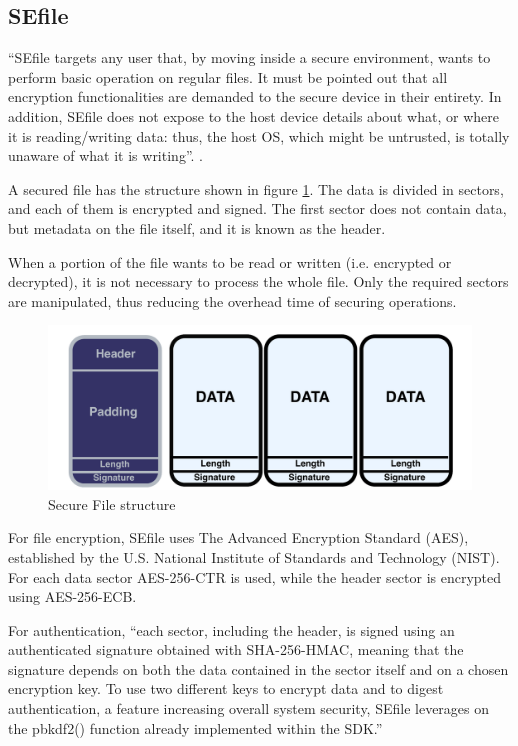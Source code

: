 \subsection{SEfile}

``SEfile targets any user that, by moving inside a secure environment, wants to perform basic operation on regular files. It must be pointed out that all encryption functionalities are demanded to the secure device in their entirety. In addition, SEfile does not expose to the host device details about what, or where it is reading/writing data: thus, the host OS, which might be untrusted, is totally unaware of what it is writing''. \cite{L2UserMan}.


A secured file has the structure shown in figure \ref{fig:secfile}. The data is divided in sectors, and each of them is encrypted and signed. The first sector does not contain data, but metadata on the file itself, and it is known as the header.

When a portion of the file wants to be read or written (i.e. encrypted or decrypted), it is not necessary to process the whole file. Only the required sectors are manipulated, thus reducing the overhead time of securing operations.

\begin{figure}[htb]
  \centering
  \captionsetup{justification=centering}
  \centerline{\includegraphics[width=1\columnwidth]{chapters/figures/frameworks/secfile.pdf}}
  \caption{Secure File structure}
  \label{fig:secfile}
\end{figure}

For file encryption, SEfile uses The Advanced Encryption Standard (AES), established by the U.S. National Institute of Standards and Technology (NIST). For each data sector AES-256-CTR is used, while the header sector is encrypted using AES-256-ECB.

For authentication, ``each sector, including the header, is signed using an authenticated signature obtained with SHA-256-HMAC, meaning that the signature depends on both the data contained in the sector itself and on a chosen encryption key. To use two different keys to encrypt data and to digest authentication, a feature increasing overall system security, SEfile leverages on the pbkdf2() function already implemented within the SDK.''\cite{L2UserMan}


